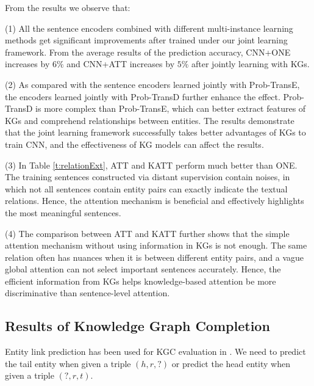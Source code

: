 \documentclass[letterpaper]{article} %
\begin{document}
From the results we observe that:

(1) All the sentence encoders combined with different multi-instance learning methods get significant improvements after trained under our joint learning framework. From the average results of the prediction accuracy, CNN+ONE increases by $6\%$ and CNN+ATT increases by $5\%$ after jointly learning with KGs. 

(2) As compared with the sentence encoders learned jointly with Prob-TransE, the encoders learned jointly with Prob-TransD further enhance the effect. Prob-TransD is more complex than Prob-TransE, which can better extract features of KGs and comprehend relationships between entities. The results demonstrate that the joint learning framework successfully takes better advantages of KGs to train CNN, and the effectiveness of KG models can affect the results. 

(3) In Table \ref{t:relationExt}, ATT and KATT perform much better than ONE. The training sentences constructed via distant supervision contain noises, in which not all sentences contain entity pairs can exactly indicate the textual relations. Hence, the attention mechanism is beneficial and effectively highlights the most meaningful sentences. 

(4) The comparison between ATT and KATT further shows that the simple attention mechanism without using information in KGs is not enough. The same relation often has nuances when it is between different entity pairs, and a vague global attention can not select important sentences accurately. Hence, the efficient information from KGs helps knowledge-based attention be more discriminative than sentence-level attention.






\subsection{Results of Knowledge Graph Completion}


Entity link prediction has been used for KGC evaluation in \cite{bordes2013translating}. We need to predict the tail entity when given a triple $(h, r, ?)$ or predict the head entity when given a triple $(?, r ,t)$. 
\end{document}
